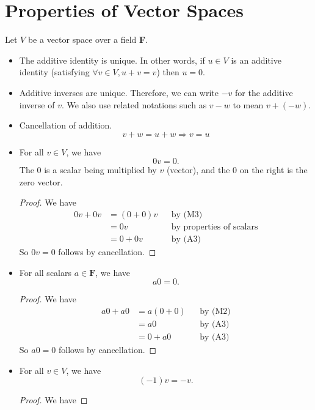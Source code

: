 \documentclass[11pt]{article}
\begin{document}
    \pagebreak

    \section{Properties of Vector Spaces}

    Let $V$ be a vector space over a field \textbf{F}.
    \begin{itemize}
        \item The additive identity is unique. In other words, if \(u \in V\) is an additive identity (satisfying \(\forall v \in V, u + v = v\)) then \(u = 0\).
        \item Additive inverses are unique. Therefore, we can write \(-v\) for the additive inverse of \(v\). We also use related notations such as \(v-w\) to mean \(v + (-w)\).
        \item Cancellation of addition. \[v + w = u + w \Rightarrow v = u\]
        \item For all \(v \in V\), we have \[0v = 0.\] The 0 is a scalar being multiplied by $v$ (vector), and the 0 on the right is the zero vector.
        \begin{proof}
            We have
            \begin{align*}
                0v + 0v &= (0 + 0)v && \text{by (M3)}                  \\
                        &= 0v       && \text{by properties of scalars} \\
                        &= 0 + 0v   && \text{by (A3)}
            \end{align*}
            So \(0v = 0\) follows by cancellation.
        \end{proof}
        \item For all scalars \(a \in \textbf{F}\), we have \[a0 = 0.\]
        \begin{proof}
            We have
            \begin{align*}
                a0 + a0 &= a(0 + 0) && \text{by (M2)} \\
                        &= a0       && \text{by (A3)} \\
                        &= 0 + a0   && \text{by (A3)}
            \end{align*}
            So \(a0 = 0\) follows by cancellation.
        \end{proof}
        \item For all \(v \in V\), we have \[(-1)v = -v.\]
        \begin{proof}
            We have

\end{proof}
\end{itemize}
\end{document}
